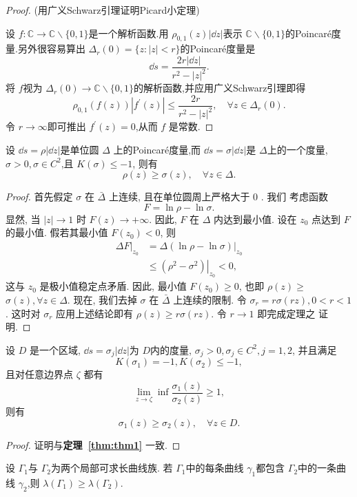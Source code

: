 \begin{proof}{(用广义Schwarz引理证明Picard小定理)}

    设 $f\colon \mathbb{C}\to \mathbb{C}\backslash \{0,1\} $是一个解析函数.用 $\rho_{0,1}(z)|\dd z|$表示 $\mathbb{C}\backslash \{0,1\}$的Poincar\'{e}度量.另外很容易算出 $\Delta_r (0)=\{z\colon |z|<r\}$的Poincar\'{e}度量是
    \[\dd s=\frac{2r|\dd z|}{r^2-|z|^2}.\]
    将 $f$视为 $\Delta_r (0)\to \mathbb{C}\backslash\{0,1\}$的解析函数,并应用广义Schwarz引理即得
    \[\rho_{0,1}(f(z))|f^\prime (z)|\leqslant \frac{2r}{r^2-|z|^2},\quad\forall z\in \Delta_r (0).\]
    令 $r\to\infty$即可推出 $f^\prime (z)=0$,从而 $f$ 是常数.
\end{proof}
\begin{thm}\label{thm:thm1}
    设 $\dd s=\rho |\dd z|$是单位圆 $\Delta$ 上的Poincar\'{e}度量,而 $\dd s=\sigma|\dd z|$是 $\Delta$上的一个度量, $\sigma>0,\sigma\in C^2$,且 $K(\sigma)\leqslant -1$, 则有
    \[\rho(z)\geqslant \sigma(z),\quad\forall z\in \Delta.\]
\end{thm}
\begin{proof}
    首先假定 $\sigma$ 在 $\bar{\Delta}$ 上连续, 且在单位圆周上严格大于 0 . 我们 考虑函数
$$
F=\ln \rho-\ln \sigma .
$$
显然, 当 $|z| \rightarrow 1$ 时 $F(z) \rightarrow+\infty$. 因此, $F$ 在 $\Delta$ 内达到最小值. 设在 $z_0$ 点达到 $F$ 的最小值. 假若其最小值 $F\left(z_0\right)<0$, 则
$$
\begin{aligned}
\left.\Delta F\right|_{z_0} & =\left.\Delta(\ln \rho-\ln \sigma)\right|_{z_0} \\
& \leqslant\left.\left(\rho^2-\sigma^2\right)\right|_{z_0}<0,
\end{aligned}
$$
这与 $z_0$ 是极小值稳定点矛盾. 因此, 最小值 $F\left(z_0\right) \geqslant 0$, 也即 $\rho(z) \geqslant$ $\sigma(z), \forall z \in \Delta$.
现在, 我们去掉 $\sigma$ 在 $\bar{\Delta}$ 上连续的限制. 令 $\sigma_r=r \sigma(r z), 0<r<1$. 这时对 $\sigma_r$ 应用上述结论即有 $\rho(z) \geqslant r \sigma(r z)$. 令 $r \rightarrow 1$ 即完成定理之 证明.
\end{proof}
\begin{thm}
    设 $D$ 是一个区域, $\dd s=\sigma_j |\dd z|$为 $D$内的度量, $\sigma_j>0,\sigma_j\in C^2,j=1,2$, 并且满足
    \[K(\sigma_1)=-1,K(\sigma_2)\leqslant -1,\]
    且对任意边界点 $\zeta$ 都有
    \[\lim_{z\to\zeta}\inf \frac{\sigma_1 (z)}{\sigma_2 (z)}\geqslant 1,\]
    则有
    \[\sigma_1 (z)\geqslant \sigma_2 (z),\quad\forall z\in D.\]
\end{thm}
\begin{proof}
    证明与\textbf{定理~\ref{thm:thm1}} 一致.
\end{proof}
\begin{thm}[比较定理]\label{thm: compare thm}
    设 $\Gamma_1$与 $\Gamma_2$为两个局部可求长曲线族. 若 $\Gamma_1$中的每条曲线 $\gamma_1$都包含 $\Gamma_2$中的一条曲线 $\gamma_2$,则 $\lambda (\Gamma_1)\geqslant \lambda (\Gamma_2)$.
\end{thm}

